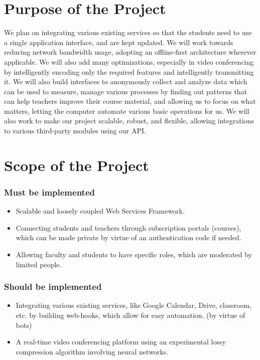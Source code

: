 \section{Purpose of the Project}

We plan on integrating various existing services so that the students need to use a single application interface, 
and are kept updated. We will work towards reducing network bandwidth usage, adopting an offline-first architecture 
wherever applicable. 
We will also add many optimizations, especially in video conferencing by intelligently encoding only the 
required features and intelligently transmitting it. We will also build interfaces to anonymously collect and 
analyze data which can be used to measure, manage various processes by finding out patterns that can help teachers 
improve their course material, and allowing us to focus on what matters, letting the computer automate various 
basic operations for us. We will also work to make our project scalable, robust, and flexible, allowing integrations 
to various third-party modules using our API.

\section{Scope of the Project}

\subsubsection{Must be implemented}
\begin{itemize}
    \item Scalable and loosely coupled Web Services Framework.
    \item Connecting students and teachers through subscription portals (courses), 
    which can be made private by virtue of an authentication code if needed.
    \item Allowing faculty and students to have specific roles, which are moderated by limited people.
\end{itemize}

\subsubsection{Should be implemented}
\begin{itemize}
    \item Integrating various existing services, like Google Calendar, Drive, classroom, etc. 
    by building web-hooks, which allow for easy automation. (by virtue of bots)
    \item A real-time video conferencing platform using an experimental lossy compression algorithm involving neural networks.
\end{itemize}

